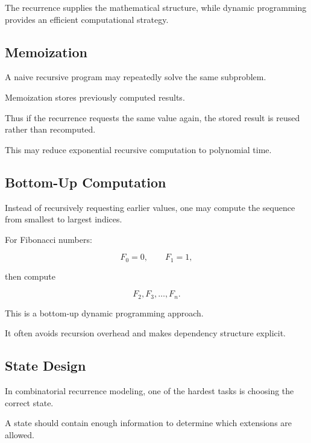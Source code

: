 The recurrence supplies the mathematical structure, while dynamic
programming provides an efficient computational strategy.

\subsection{Memoization}
\label{subsec:memoization}

A naive recursive program may repeatedly solve the same subproblem.

Memoization stores previously computed results.

Thus if the recurrence requests the same value again, the stored result
is reused rather than recomputed.

This may reduce exponential recursive computation to polynomial time.

\subsection{Bottom-Up Computation}
\label{subsec:bottom-up-recurrence}

Instead of recursively requesting earlier values, one may compute the
sequence from smallest to largest indices.

For Fibonacci numbers:

\[
F_0=0,
\qquad
F_1=1,
\]

then compute

\[
F_2,
F_3,
\ldots,
F_n.
\]

This is a bottom-up dynamic programming approach.

It often avoids recursion overhead and makes dependency structure
explicit.

\subsection{State Design}
\label{subsec:recurrence-state-design}

In combinatorial recurrence modeling, one of the hardest tasks is
choosing the correct state.

A state should contain enough information to determine which extensions
are allowed.

